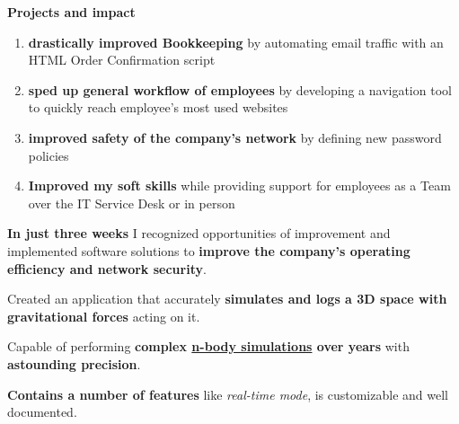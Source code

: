\documentclass[]{jonas-cv}
\begin{document}
\begin{minipage}[t]{0.63\textwidth} 


\tinysectionsep
{}
\sectionsep

\begin{tightemize}
    \item \textbf{Projects and impact}
    \begin{enumerate}
        \item \textbf{drastically improved Bookkeeping} by automating email traffic with an HTML Order Confirmation script
        \item \textbf{sped up general workflow of employees} by developing a navigation tool to quickly reach employee's most used websites
        \item \textbf{improved safety of the company's network} by defining new password policies
        \item \textbf{Improved my soft skills} while providing support for employees as a Team over the IT Service Desk or in person
    \end{enumerate}
    \vspace{1mm}

    \item [\faicon{angle-double-right}] \textbf{In just three weeks} I recognized opportunities of improvement and implemented software solutions
    to \textbf{improve the company's operating efficiency and network security}.
\end{tightemize}
\largesectionsep



\tinysectionsep
{}
\begin{tightemize}
    \item Created an application that accurately \textbf{simulates and logs a 3D space with gravitational forces} acting on it.
    \item Capable of performing \textbf{complex \href{https://en.wikipedia.org/wiki/N-body_problem}{n-body simulations} over years} with \textbf{astounding precision}.
    \item \textbf{Contains a number of features} like \emph{real-time mode}, is customizable and well documented.


\end{tightemize}
\end{minipage}
\end{document}
